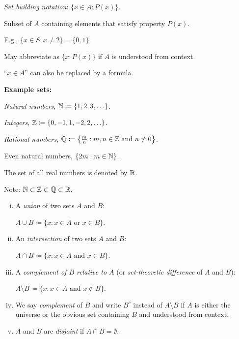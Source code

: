 \documentclass[10pt,aspectratio=149]{beamer}
\begin{document}
\begin{frame}
\emph{Set building notation}:
\quad $\bigl\{ x \in A : P(x) \bigr\}$.

\pause
\medskip

Subset of $A$ containing elements that satisfy property $P(x)$.

\medskip
\pause

E.g., $\{ x \in S : x \not= 2 \} = \{ 0, 1 \}$.

\medskip
\pause

May abbreviate as $\bigl\{ x : P(x) \bigr\}$ if $A$ is understood
from context.

\medskip
\pause

``$x \in A$'' can also be replaced by a formula.

\medskip
\pause

\textbf{Example sets:}

\medskip
\pause

\emph{Natural numbers}, ${\mathbb{N}} \coloneqq \{ 1, 2, 3, \ldots \}$.

\medskip
\pause

\emph{Integers}, ${\mathbb{Z}} \coloneqq \{ 0, -1, 1, -2, 2, \ldots \}$.

\medskip
\pause

\emph{Rational numbers}, ${\mathbb{Q}} \coloneqq \bigl\{ \frac{m}{n} :  m, n \in {\mathbb{Z}} \text{ and } n \not= 0 \bigr\}$.

\medskip
\pause

Even natural numbers, $\{  2m : m \in {\mathbb{N}} \}$.

\medskip
\pause

The set of all real numbers is denoted by ${\mathbb{R}}$.

\medskip
\pause

Note: ${\mathbb{N}} \subset {\mathbb{Z}} \subset {\mathbb{Q}} \subset {\mathbb{R}}$.

\end{frame}

\begin{frame}
\begin{definition}
\begin{enumerate}[(i)]
\item
A \emph{union} of two sets $A$ and $B$:

$A \cup B \coloneqq \{ x : x \in A \text{ or } x \in B \}$.
\item
\pause
An \emph{intersection} of two sets $A$ and $B$:

$A \cap B \coloneqq \{ x : x \in A \text{ and } x \in B \}$.
\item
\pause
A \emph{complement of $B$ relative to $A$}
(or \emph{set-theoretic difference} of $A$ and $B$):

$A \setminus B \coloneqq \{ x : x \in A \text{ and } x \notin B \}$.
\item
\pause
We say
\emph{complement} of $B$ and write $B^c$
instead of $A \setminus B$ if
$A$ is either the universe or the obvious
set containing $B$ and understood from context.
\item
\pause
$A$ and $B$ are \emph{disjoint} if $A \cap B = \emptyset$.
\end{enumerate}
\end{definition}
\end{frame}
\end{document}
